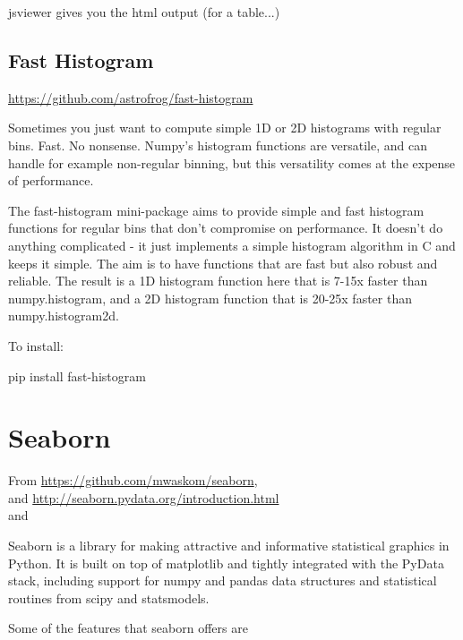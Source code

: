 \documentclass[11pt,a4paper]{article}
\begin{document}
jsviewer gives you the html output (for a table...)

\subsection{Fast Histogram}
\href{https://github.com/astrofrog/fast-histogram}{https://github.com/astrofrog/fast-histogram}

Sometimes you just want to compute simple 1D or 2D histograms with
regular bins. Fast. No nonsense. Numpy's histogram functions are
versatile, and can handle for example non-regular binning, but this
versatility comes at the expense of performance.

The fast-histogram mini-package aims to provide simple and fast
histogram functions for regular bins that don't compromise on
performance. It doesn't do anything complicated - it just implements a
simple histogram algorithm in C and keeps it simple. The aim is to
have functions that are fast but also robust and reliable. The result
is a 1D histogram function here that is 7-15x faster than
numpy.histogram, and a 2D histogram function that is 20-25x faster
than numpy.histogram2d.

To install:

pip install fast-histogram



\newpage
\section{Seaborn}
From \href{https://github.com/mwaskom/seaborn}{https://github.com/mwaskom/seaborn}, \\
and \href{http://seaborn.pydata.org/introduction.html}{http://seaborn.pydata.org/introduction.html}\\ 
and 

Seaborn is a library for making attractive and informative statistical graphics in Python. It is built on top of matplotlib and tightly integrated with the PyData stack, including support for numpy and pandas data structures and statistical routines from scipy and statsmodels.

Some of the features that seaborn offers are
\end{document}
